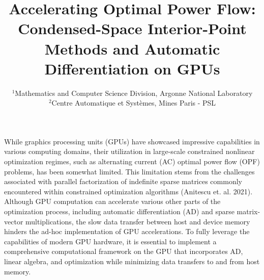 % 
\title{Accelerating Optimal Power Flow: Condensed-Space Interior-Point Methods and Automatic Differentiation on GPUs}

\author{
\and
{}
}

\date{\small
  $^{1}$Mathematics and Computer Science Division, Argonne National Laboratory\\
  $^{2}$Centre Automatique et Syst\`{e}mes, Mines Paris - PSL
}

\maketitle

While graphics processing units (GPUs) have showcased impressive capabilities in various computing domains, their utilization in large-scale constrained nonlinear optimization regimes, such as alternating current (AC) optimal power flow (OPF) problems, has been somewhat limited. This limitation stems from the challenges associated with parallel factorization of indefinite sparse matrices commonly encountered within constrained optimization algorithms (Anitescu et. al. 2021). Although GPU computation can accelerate various other parts of the optimization process, including automatic differentiation (AD) and sparse matrix-vector multiplications, the slow data transfer between host and device memory hinders the ad-hoc implementation of GPU accelerations. To fully leverage the capabilities of modern GPU hardware, it is essential to implement a comprehensive computational framework on the GPU that incorporates AD, linear algebra, and optimization while minimizing data transfers to and from host memory.


